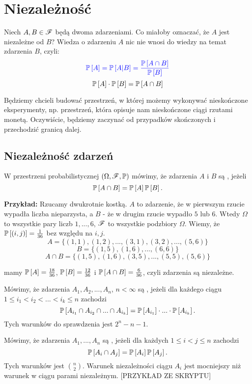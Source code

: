 \section{Niezależność}

Niech $A, B\in \mathcal{F}$ będą dwoma zdarzeniami. Co miałoby oznaczać, że $A$ jest niezależne od $B$? Wiedza o zdarzeniu $A$ nic nie wnosi do wiedzy na temat zdarzenia $B$, czyli:
$$\color{blue}\mathbb{P}\left[A\right]=\mathbb{P}\left[A|B\right]={\mathbb{P}\left[A\cap B\right]\over\mathbb{P}\left[B\right]}$$
$$\mathbb{P}\left[A\right]\cdot\mathbb{P}\left[B\right]=\mathbb{P}\left[A\cap B\right]$$

Będziemy chcieli budować przestrzeń, w której możemy wykonywać nieskończone eksperymenty, np. przestrzeń, która opisuje nam nieskończone ciągi rzutami monetą. Oczywiście, będziemy zaczynać od przypadków skończonych i przechodzić granicą dalej.

\subsection{Niezależność zdarzeń}

W przestrzeni probabilistycznej $(\Omega,\mathcal{F}, \mathbb{P})$ mówimy, że zdarzenia $A$ i $B$ są , jeżeli
$$\mathbb{P}\left[A\cap B\right]=\mathbb{P}\left[A\right]\mathbb{P}\left[B\right].$$

\textbf{Przykład:} Rzucamy dwukrotnie kostką. $A$ to zdarzenie, że w pierwszym rzucie wypadła liczba nieparzysta, a $B$ - że w drugim rzucie wypadło $5$ lub $6$. Wtedy $\Omega$ to wszystkie pary liczb $1,...,6$, $\mathcal{F}$ to wszystkie podzbiory $\Omega$. Wiemy, że $\mathbb{P}\left[(i, j)\right]=\frac1{36}$ bez względu na $i,j$.
$$A=\{(1, 1), (1, 2), ..., (3, 1), (3, 2),...,(5, 6)\}$$
$$B=\{(1, 5), (1, 6),..., (6, 6)\}$$
$$A\cap B=\{(1, 5), (1, 6), (3, 5),...,(5, 5), (5, 6)\}$$

mamy $\mathbb{P}\left[A\right]={18\over36}$, $\mathbb{P}\left[B\right]={12\over36}$ i $\mathbb{P}\left[A\cap B\right]={6\over 36}$, czyli zdarzenia są niezależne.
\medskip

Mówimy, że zdarzenia $A_1, A_2,...,A_n$, $n<\infty$ są , jeżeli dla każdego ciągu $1\leq i_1<i_2<...<i_k\leq n$ zachodzi
$$\mathbb{P}\left[A_{i_1}\cap A_{i_2}\cap ...\cap A_{i_k}\right]=\mathbb{P}\left[A_{i_1}\right]\cdot...\cdot\mathbb{P}\left[A_{i_k}\right].$$
Tych warunków do sprawdzenia jest $2^n-n-1$.
\medskip

Mówimy, że zdarzenia $A_1,...,A_n$ są , jeżeli dla każdych $1\leq i<j\leq n$ zachodzi
$$\mathbb{P}\left[A_i\cap A_j\right]=\mathbb{P}\left[A_i\right]\mathbb{P}\left[A_j\right].$$
Tych warunków jest ${n\choose 2}$. Warunek niezależności ciągu $A_i$ jest mocniejszy niż warunek w ciągu parami niezależnym. [{\large\color{orange}PRZYKŁAD ZE SKRYPTU}]
\medskip

